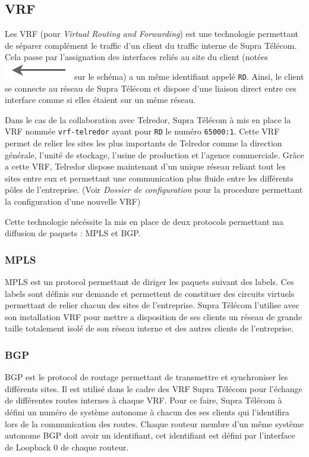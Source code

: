 \documentclass{article}
\newcommand{\tlr}{Telredor\xspace}
\newcommand{\spr}{Supra Télécom\xspace}
\newcommand{\flechevrf}{\includegraphics[scale=0.4]{img/lien-vrf-fleche}}
\begin{document}
\subsection{VRF}
\label{vrf}

Les VRF (pour \emph{Virtual Routing and Forwarding}) est une technologie permettant de séparer complément le traffic d'un client du traffic interne de \spr.
Cela passe par l'assignation des interfaces reliés au site du client (notées \flechevrf sur le schéma) a un même identifiant appelé \texttt{RD}.
Ainsi, le client se connecte au réseau de \spr et dispose d'une liaison direct entre ces interface comme si elles étaient sur un même réseau.

Dans le cas de la collaboration avec \tlr, \spr à mis en place la VRF nommée \texttt{vrf-telredor} ayant pour \texttt{RD} le numéro \texttt{65000:1}.
Cette VRF permet de relier les sites les plus importants de \tlr comme la direction générale, l'unité de stockage, l'usine de production et l'agence commerciale.
Grâce a cette VRF, \tlr dispose maintenant d'un unique réseau reliant tout les sites entre eux et permettant une communication plus fluide entre les différents pôles de l'entreprise. (Voir \emph{Dossier de configuration} pour la procedure permettant la configuration d'une nouvelle VRF)

Cette technologie nécéssite la mis en place de deux protocols permettant ma diffusion de paquets : MPLS et BGP.

\subsubsection{MPLS}

MPLS est un protocol permettant de diriger les paquets suivant des labels.
Ces labels sont définis sur demande et permettent de constituer des circuits virtuels permettant de relier chacun des sites de l'entreprise.
\spr l'utilise avec son installation VRF pour mettre a disposition de ses clients un réseau de grande taille totalement isolé de son réseau interne et des autres clients de l'entreprise.

\subsubsection{BGP}

BGP est le protocol de routage permettant de transmettre et synchroniser les différents sites.
Il est utilisé dans le cadre des VRF \spr pour l'échange de différentes routes internes à chaque VRF.
Pour ce faire, \spr à défini un numéro de système autonome à chacun des ses clients qui l'identifira lors de la communication des routes.
Chaque routeur membre d'un même système autonome BGP doit avoir un identifiant, cet identifiant est défini par l'interface de Loopback 0 de chaque routeur.
\end{document}
